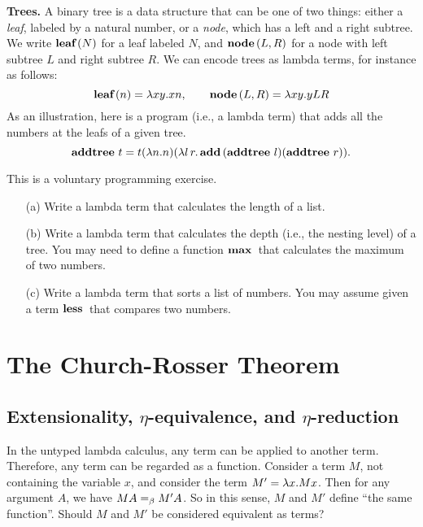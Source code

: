 \documentclass{article}
\begin{document}
{\bf Trees.} A binary tree is a data structure that can be one of two
things: either a {\em leaf}, labeled by a natural number, or a {\em
  node}, which has a left and a right subtree. We write $\mathop{\textbf{\bf leaf}\,}(N)$ for
a leaf labeled $N$, and $\mathop{\textbf{\bf node}\,}(L,R)$ for a node with left subtree $L$
and right subtree $R$. We can encode trees as lambda terms, for
instance as follows:
\[ \mathop{\textbf{\bf leaf}\,}(n) = \lambda xy.xn,\hspace{2em} \mathop{\textbf{\bf node}\,}(L,R) = \lambda xy.yLR \]
As an illustration, here is a program (i.e., a lambda term) that adds
all the numbers at the leafs of a given tree.
\[ \mathop{\textbf{\bf addtree}\,} t = t(\lambda n.n)(\lambda l\,
r.\mathop{\textbf{\bf add}\,}(\mathop{\textbf{\bf addtree}\,}l)(\mathop{\textbf{\bf addtree}\,}r)).
\]

\begin{exercise}
  This is a voluntary programming exercise.
  \begin{enumerate}
  \item[(a)] Write a lambda term that calculates the length of a
    list.
  \item[(b)] Write a lambda term that calculates the depth (i.e., the
    nesting level) of a tree. You may need to define a function
    $\mathop{\textbf{\bf max}\,}$ that calculates the maximum of two numbers.
  \item[(c)] Write a lambda term that sorts a list of numbers. You
    may assume given a term $\mathop{\textbf{\bf less}\,}$ that compares two numbers. 
  \end{enumerate}
\end{exercise}

\section{The Church-Rosser Theorem}

\subsection{Extensionality, $\eta$-equivalence, and $\eta$-reduction}

In the untyped lambda calculus, any term can be applied to another
term. Therefore, any term can be regarded as a function.  Consider a
term $M$, not containing the variable $x$, and consider the term
$M'=\lambda x.Mx$. Then for any argument $A$, we have $MA=_{\beta} M'A$. So in
this sense, $M$ and $M'$ define ``the same function''.  Should $M$ and
$M'$ be considered equivalent as terms?
\end{document}
